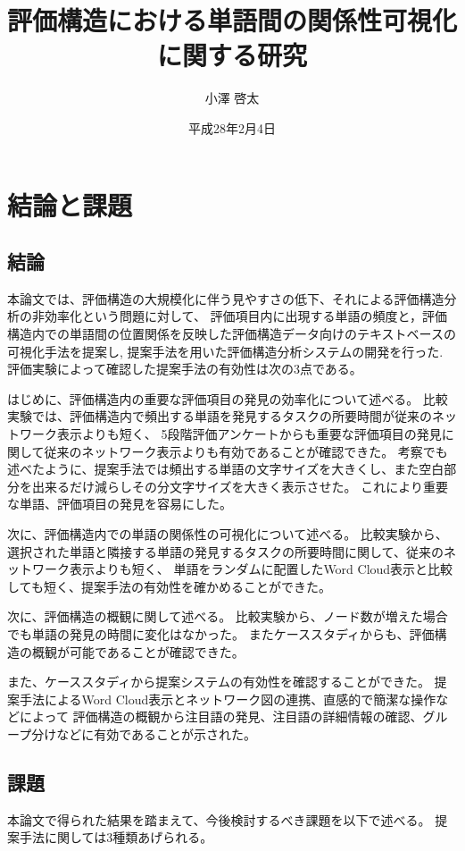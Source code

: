 \documentclass[syuuron]{kuee}
\title{評価構造における単語間の関係性可視化に関する研究}
\author{小澤 啓太}
\date{平成28年2月4日}
\begin{document}
\maketitle
\tableofcontents


\chapter{結論と課題}
	\section{結論}
		本論文では、評価構造の大規模化に伴う見やすさの低下、それによる評価構造分析の非効率化という問題に対して、
		評価項目内に出現する単語の頻度と，評価構造内での単語間の位置関係を反映した評価構造データ向けのテキストベースの可視化手法を提案し, 
		提案手法を用いた評価構造分析システムの開発を行った. 
		評価実験によって確認した提案手法の有効性は次の3点である。
		
		はじめに、評価構造内の重要な評価項目の発見の効率化について述べる。
		比較実験では、評価構造内で頻出する単語を発見するタスクの所要時間が従来のネットワーク表示よりも短く、
		5段階評価アンケートからも重要な評価項目の発見に関して従来のネットワーク表示よりも有効であることが確認できた。
		考察でも述べたように、提案手法では頻出する単語の文字サイズを大きくし、また空白部分を出来るだけ減らしその分文字サイズを大きく表示させた。
		これにより重要な単語、評価項目の発見を容易にした。
		
		次に、評価構造内での単語の関係性の可視化について述べる。
		比較実験から、選択された単語と隣接する単語の発見するタスクの所要時間に関して、従来のネットワーク表示よりも短く、
		単語をランダムに配置したWord Cloud表示と比較しても短く、提案手法の有効性を確かめることができた。
		
		次に、評価構造の概観に関して述べる。
		比較実験から、ノード数が増えた場合でも単語の発見の時間に変化はなかった。
		またケーススタディからも、評価構造の概観が可能であることが確認できた。
		
		また、ケーススタディから提案システムの有効性を確認することができた。
		提案手法によるWord Cloud表示とネットワーク図の連携、直感的で簡潔な操作などによって
		評価構造の概観から注目語の発見、注目語の詳細情報の確認、グループ分けなどに有効であることが示された。		
		
	\section{課題}
		本論文で得られた結果を踏まえて、今後検討するべき課題を以下で述べる。
		提案手法に関しては3種類あげられる。
		
\end{document}
